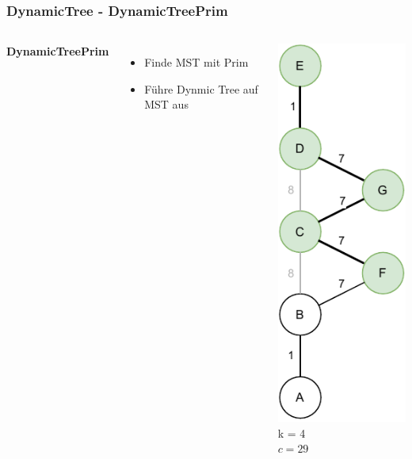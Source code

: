 \documentclass[aspectratio=169]{beamer}
\begin{document}
\begin{frame}
	\frametitle{DynamicTree - DynamicTreePrim}
	\begin{columns}[c] %
		
		\textbf{DynamicTreePrim}
		\begin{itemize}
			\item Finde MST mit Prim
			\item Führe Dynmic Tree auf MST aus
		\end{itemize}
		\includegraphics[scale=.6]{dynamic_prim.pdf}
		k = 4\\
		$c = 29$
		
		
	\end{columns}
	\end{frame}
	
\end{document}
